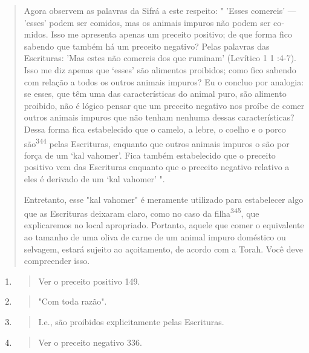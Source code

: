\begin{quote}
Agora observem as palavras da Sifrá a este respeito: " 'Esses come­reis'
--- 'esses' podem ser comidos, mas os animais impuros não podem ser
co­midos. Isso me apresenta apenas um preceito positivo; de que forma
fico sa­bendo que também há um preceito negativo? Pelas palavras das
Escrituras: 'Mas estes não comereis dos que ruminam' (Levítico 1 1
:4-7). Isso me diz apenas que `esses' são alimentos proibidos; como fico
sabendo com relação a todos os ou­tros animais impuros? Eu o concluo por
analogia: se esses, que têm uma das características do animal puro, são
alimento proibido, não é lógico pensar que um preceito negativo nos
proíbe de comer outros animais impuros que não tenham nenhuma dessas
características? Dessa forma fica estabelecido que o camelo, a lebre, o
coelho e o porco são\textsuperscript{344} pelas Escrituras, enquanto que
ou­tros animais impuros o são por força de um `kal vahomer'. Fica também
estabe­lecido que o preceito positivo vem das Escrituras enquanto que o
preceito ne­gativo relativo a eles é derivado de um `kal vahomer' ".

Entretanto, esse "kal vahomer" é meramente utilizado para esta­belecer
algo que as Escrituras deixaram claro, como no caso da
filha\textsuperscript{345}, que explicaremos no local apropriado.
Portanto, aquele que comer o equivalente ao tamanho de uma oliva de
carne de um animal impuro doméstico ou selva­gem, estará sujeito ao
açoitamento, de acordo com a Torah. Você deve com­preender isso.
\end{quote}

\begin{enumerate}
\def\labelenumi{\arabic{enumi}.}
\setcounter{enumi}{341}
\item
  \begin{quote}
  Ver o preceito positivo 149.
  \end{quote}
\item
  \begin{quote}
  "Com toda razão".
  \end{quote}
\item
  \begin{quote}
  I.e., são proibidos explicitamente pelas Escrituras.
  \end{quote}
\item
  \begin{quote}
  Ver o preceito negativo 336.
  \end{quote}
\end{enumerate}

